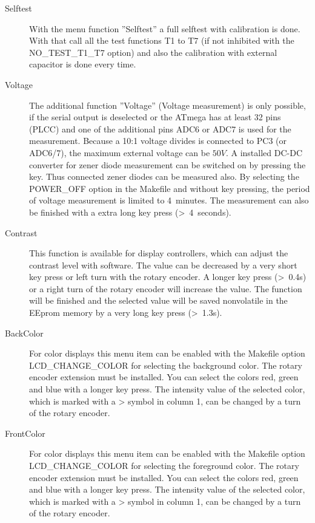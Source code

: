 \begin{description}
\item[Selftest]
With the menu function ''Selftest'' a full selftest with calibration is done.
With that call all the test functions T1 to T7 (if not inhibited with the NO\_TEST\_T1\_T7 option) 
and also the calibration with external capacitor is done every time.\\

\item[Voltage]
The additional function ''Voltage'' (Voltage measurement) is only possible, if the serial output is deselected
or the ATmega has at least 32 pins (PLCC) and one of the additional pins ADC6 or ADC7 is used for the measurement.
Because a 10:1 voltage divides is connected to PC3 (or ADC6/7), the maximum external voltage can be \(50V\).
A installed DC-DC converter for zener diode measurement can be switched on by pressing the key.
Thus connected zener diodes can be measured also.
By selecting the POWER\_OFF option in the Makefile and without key pressing, the period of voltage measurement is limited to 4~minutes.
The measurement can also be finished with a extra long key press (\textgreater~4~seconds).

\item[Contrast] 
This function is available for display controllers, which can adjust the contrast level with software.
The value can be decreased by a very short key press or left turn with the rotary encoder.
A longer key press (\textgreater~0.4s) or a right turn of the rotary encoder will increase the value.
The function will be finished and the selected value will be saved nonvolatile in the EEprom memory 
by a very long key press (\textgreater~1.3s).

\item[BackColor]
For color displays this menu item can be enabled with the Makefile option LCD\_CHANGE\_COLOR 
for selecting the background color. The rotary encoder extension must be installed.
You can select the colors red, green and blue with a longer key press. The intensity value of the
selected color, which is marked with a > symbol in column 1, can be changed by a turn of the rotary encoder.

\item[FrontColor]
For color displays this menu item can be enabled with the Makefile option LCD\_CHANGE\_COLOR 
for selecting the foreground color. The rotary encoder extension must be installed.
You can select the colors red, green and blue with a longer key press. The intensity value of the
selected color, which is marked with a > symbol in column 1, can be changed by a turn of the rotary encoder.


\end{description}
